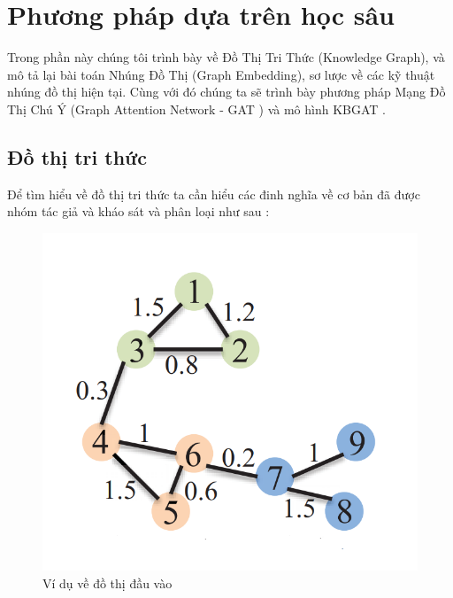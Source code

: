 \section{Phương pháp dựa trên học sâu}
Trong phần này chúng tôi trình bày về Đồ Thị Tri Thức (Knowledge Graph), và mô tả lại bài toán Nhúng Đồ Thị (Graph Embedding), sơ lược về các kỹ thuật nhúng đồ thị hiện tại. Cùng với đó chúng ta sẽ trình bày phương pháp Mạng Đồ Thị Chú Ý (Graph Attention Network - GAT \cite{velivckovic2017graph}) và mô hình KBGAT \cite{nathani2019learning}.
\subsection{Đồ thị tri thức}

Để tìm hiểu về đồ thị tri thức ta cần hiểu các đinh nghĩa về cơ bản đã được nhóm tác giả \cite{cai2018comprehensive} và \cite{goyal2018graph} kháo sát và phân loại như sau :

\begin{figure}[htp]
	\centering
	\includegraphics[width=7 cm]{images/graph_emb_1.png}
	\caption{Ví dụ về đồ thị đầu vào}
	\label{fig:graphInput}
\end{figure}

